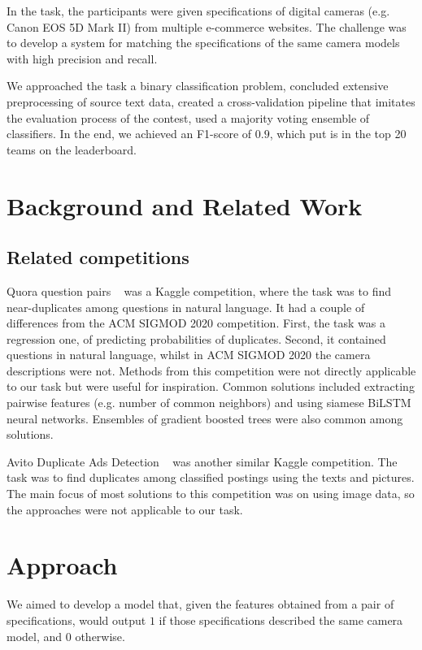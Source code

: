 \documentclass[sigconf]{acmart}
\begin{document}
In the task, the participants were given specifications of digital cameras (e.g. Canon EOS 5D Mark II) from multiple e-commerce websites. The challenge was to develop a system for matching the specifications of the same camera models with high precision and recall.

We approached the task a binary classification problem, concluded extensive preprocessing of source text data, created a cross-validation pipeline that imitates the evaluation process of the contest, used a majority voting ensemble of classifiers. In the end, we achieved an F1-score of $0.9$, which put is in the top 20 teams on the leaderboard.

\section{Background and Related Work}

\subsection{Related competitions}

Quora question pairs ~\cite{quora} was a Kaggle competition, where the task was to find near-duplicates among questions in natural language. It had a couple of differences from the ACM SIGMOD 2020 competition. First, the task was a regression one, of predicting probabilities of duplicates. Second, it contained questions in natural language, whilst in ACM SIGMOD 2020 the camera descriptions were not. Methods from this competition were not directly applicable to our task but were useful for inspiration. Common solutions included extracting pairwise features (e.g. number of common neighbors) and using siamese BiLSTM neural networks. Ensembles of gradient boosted trees were also common among solutions.


Avito Duplicate Ads Detection ~\cite{quora} was another similar Kaggle competition. The task was to find duplicates among classified postings using the texts and pictures. The main focus of most solutions to this competition was on using image data, so the approaches were not applicable to our task.

\section{Approach}
We aimed to develop a model that, given the features obtained from a pair of specifications, would output $1$ if those specifications described the same camera model, and $0$ otherwise. 
\end{document}
